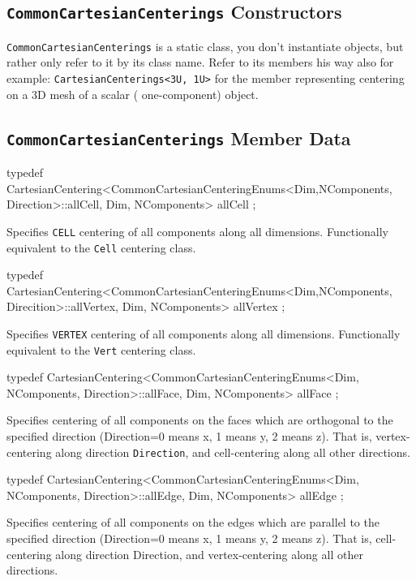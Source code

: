 \subsection{\texttt{CommonCartesianCenterings} Constructors}
\texttt{CommonCartesianCenterings} is a static class, you don't instantiate objects, but rather only refer to it by its class name. 
Refer to its members his way also for example: \texttt{CartesianCenterings<3U, 1U>} for the member representing centering on a 3D mesh of a scalar 
( one-component) object. 

\subsection{\texttt{CommonCartesianCenterings} Member Data}
\begin{smallcode}
typedef CartesianCentering<CommonCartesianCenteringEnums<Dim,NComponents,
Direction>::allCell, Dim, NComponents> allCell ;
\end{smallcode}
Specifies \texttt{CELL} centering of all components along all dimensions. Functionally equivalent to the \texttt{Cell} centering class. 

\begin{smallcode}
typedef CartesianCentering<CommonCartesianCenteringEnums<Dim,NComponents,
Direcition>::allVertex, Dim, NComponents> allVertex ;
\end{smallcode}
Specifies \texttt{VERTEX} centering of all components along all dimensions. Functionally equivalent to the \texttt{Vert} centering class. 

\begin{smallcode}
typedef CartesianCentering<CommonCartesianCenteringEnums<Dim, NComponents, 
Direction>::allFace, Dim, NComponents> allFace ;
\end{smallcode}
Specifies centering of all components on the faces which are orthogonal to the specified direction (Direction=0 means x, 1 means y, 2 means z). 
That is, vertex-centering along direction \texttt{Direction}, and cell-centering along all other directions. 

\begin{smallcode}
typedef CartesianCentering<CommonCartesianCenteringEnums<Dim, NComponents,
Direction>::allEdge, Dim, NComponents> allEdge ;
\end{smallcode}
Specifies centering of all components on the edges which are parallel to the specified direction (Direction=0 means x, 1 means y, 2 means z). That is, cell-centering 
along direction Direction, and vertex-centering along all other directions. 

